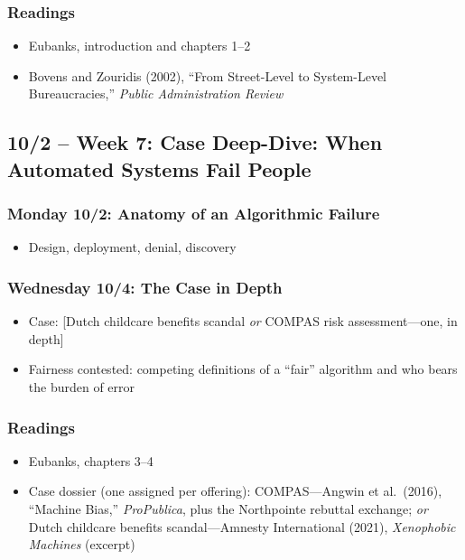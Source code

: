 \documentclass[12pt]{article}
\begin{document}
    \subsubsection*{Readings}
        \begin{itemize}
            \item Eubanks, introduction and chapters 1--2
            \item Bovens and Zouridis (2002), ``From Street-Level to System-Level Bureaucracies,'' \emph{Public Administration Review}
        \end{itemize}

\subsection*{10/2 -- Week 7: Case Deep-Dive: When Automated Systems Fail People}
    \subsubsection*{Monday 10/2: Anatomy of an Algorithmic Failure}
        \begin{itemize}
            \item Design, deployment, denial, discovery
        \end{itemize}
    \subsubsection*{Wednesday 10/4: The Case in Depth}
        \begin{itemize}
            \item Case: [Dutch childcare benefits scandal \emph{or} COMPAS risk assessment---one, in depth]
            \item Fairness contested: competing definitions of a ``fair'' algorithm and who bears the burden of error
        \end{itemize}
    \subsubsection*{Readings}
        \begin{itemize}
            \item Eubanks, chapters 3--4
            \item Case dossier (one assigned per offering): COMPAS---Angwin et al.\ (2016), ``Machine Bias,'' \emph{ProPublica}, plus the Northpointe rebuttal exchange; \emph{or} Dutch childcare benefits scandal---Amnesty International (2021), \emph{Xenophobic Machines} (excerpt)
        \end{itemize}
\end{document}
